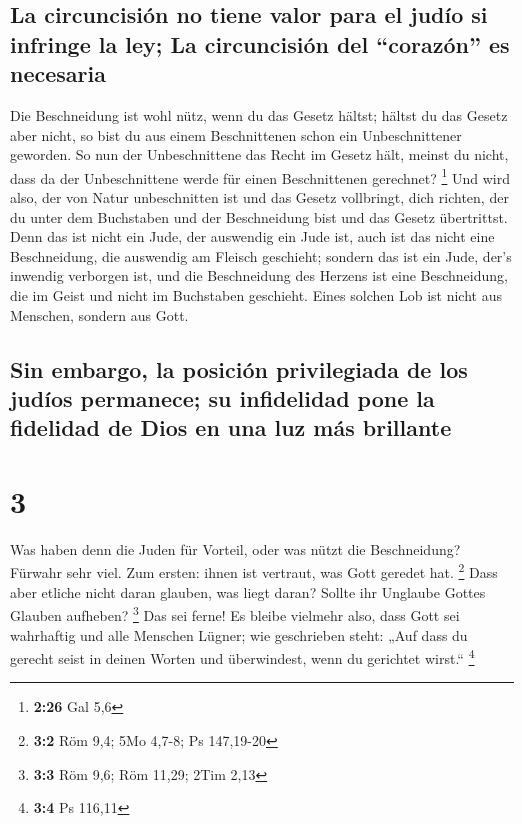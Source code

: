 \hypertarget{la-circuncisiuxf3n-no-tiene-valor-para-el-juduxedo-si-infringe-la-ley-la-circuncisiuxf3n-del-corazuxf3n-es-necesaria}{%
\subsection{La circuncisión no tiene valor para el judío si infringe la
ley; La circuncisión del ``corazón'' es
necesaria}\label{la-circuncisiuxf3n-no-tiene-valor-para-el-juduxedo-si-infringe-la-ley-la-circuncisiuxf3n-del-corazuxf3n-es-necesaria}}

 Die Beschneidung ist wohl nütz, wenn du das Gesetz
hältst; hältst du das Gesetz aber nicht, so bist du aus einem
Beschnittenen schon ein Unbeschnittener geworden.  So nun
der Unbeschnittene das Recht im Gesetz hält, meinst du nicht, dass da
der Unbeschnittene werde für einen Beschnittenen gerechnet? \footnote{\textbf{2:26}
  Gal 5,6}  Und wird also, der von Natur unbeschnitten
ist und das Gesetz vollbringt, dich richten, der du unter dem Buchstaben
und der Beschneidung bist und das Gesetz übertrittst. 
Denn das ist nicht ein Jude, der auswendig ein Jude ist, auch ist das
nicht eine Beschneidung, die auswendig am Fleisch geschieht;
 sondern das ist ein Jude, der's inwendig verborgen ist,
und die Beschneidung des Herzens ist eine Beschneidung, die im Geist und
nicht im Buchstaben geschieht. Eines solchen Lob ist nicht aus Menschen,
sondern aus Gott.

\hypertarget{sin-embargo-la-posiciuxf3n-privilegiada-de-los-juduxedos-permanece-su-infidelidad-pone-la-fidelidad-de-dios-en-una-luz-muxe1s-brillante}{%
\subsection{Sin embargo, la posición privilegiada de los judíos
permanece; su infidelidad pone la fidelidad de Dios en una luz más
brillante}\label{sin-embargo-la-posiciuxf3n-privilegiada-de-los-juduxedos-permanece-su-infidelidad-pone-la-fidelidad-de-dios-en-una-luz-muxe1s-brillante}}

\hypertarget{section-2}{%
\section{3}\label{section-2}}

 Was haben denn die Juden für Vorteil, oder was nützt die
Beschneidung?  Fürwahr sehr viel. Zum ersten: ihnen ist
vertraut, was Gott geredet hat. \footnote{\textbf{3:2} Röm 9,4; 5Mo
  4,7-8; Ps 147,19-20}  Dass aber etliche nicht daran
glauben, was liegt daran? Sollte ihr Unglaube Gottes Glauben aufheben?
\footnote{\textbf{3:3} Röm 9,6; Röm 11,29; 2Tim 2,13}  Das
sei ferne! Es bleibe vielmehr also, dass Gott sei wahrhaftig und alle
Menschen Lügner; wie geschrieben steht: „Auf dass du gerecht seist in
deinen Worten und überwindest, wenn du gerichtet wirst.`` \footnote{\textbf{3:4}
  Ps 116,11}

